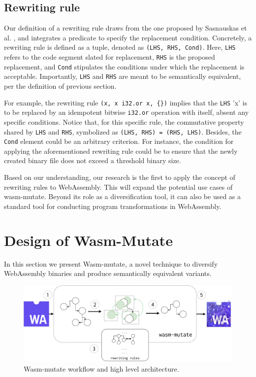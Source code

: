 \documentclass[sigplan,screen]{acmart}
\newcommand{\tool}{Wasm-mutate\xspace}
\begin{document}
\subsection{Rewriting rule}
\label{rewriting}

Our definition of a rewriting rule draws from the one proposed by Sasnauskas et al. \cite{2017arXiv171104422S}, and integrates a predicate to specify the replacement condition.
Concretely, a rewriting rule is defined as a tuple, denoted as \texttt{(LHS, RHS, Cond)}. Here, \texttt{LHS} refers to the code segment slated for replacement, \texttt{RHS} is the proposed replacement, and \texttt{Cond} stipulates the conditions under which the replacement is acceptable.
Importantly, \texttt{LHS} and \texttt{RHS} are meant to be semantically equivalent, per the definition of previous section.


For example, the rewriting rule \texttt{(x,\ x\ i32.or\ x, \{\})} implies that the \texttt{LHS} 'x' is to be replaced by an idempotent bitwise \texttt{i32.or} operation with itself, absent any specific conditions.
Notice that, for this specific rule, the commutative property shared by \texttt{LHS} and \texttt{RHS}, symbolized as \texttt{(LHS, RHS) = (RHS, LHS)}.
Besides, the \texttt{Cond} element could be an arbitrary criterion. 
For instance, the condition for applying the aforementioned rewriting rule could be to ensure that the newly created binary file does not exceed a threshold binary size.

Based on our understanding, our research is the first to apply the concept of rewriting rules to WebAssembly.
This will expand the potential use cases of wasm-mutate. 
Beyond its role as a diversification tool, it can also be used as a standard tool for conducting program transformations in WebAssembly.


\section {Design of Wasm-Mutate}
\label{tech}

In this section we present \tool, a novel technique to diversify
WebAssembly binaries and produce semantically equivalent variants.

\begin{figure}[h!]
    \centering
    \includegraphics[width=0.8\linewidth]{figures/wasm-mutate-general.pdf}
    \caption{ \tool workflow and high level architecture.}
  \label{fig:wasm-mutate}
\end{figure}
\end{document}
